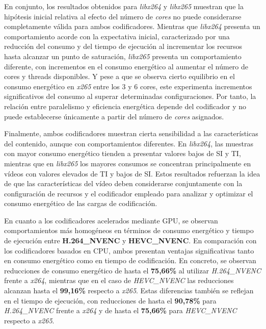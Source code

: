  En conjunto, los resultados obtenidos para \textit{libx264} y \textit{libx265} muestran que la hipótesis inicial relativa al efecto del número de \textit{cores} no puede considerarse completamente válida para ambos codificadores. Mientras que \textit{libx264} presenta un comportamiento acorde con la expectativa inicial, caracterizado por una reducción del consumo y del tiempo de ejecución al incrementar los recursos hasta alcanzar un punto de saturación, \textit{libx265} presenta un comportamiento diferente, con incrementos en el consumo energético al aumentar el número de cores y threads disponibles. Y pese a que se observa cierto equilibrio en el consumo energético en \textit{x265} entre los 3 y 6 cores, este experimenta incrementos significativos del consumo al superar determinadas configuraciones. Por tanto, la relación entre paralelismo y eficiencia energética depende del codificador y no puede establecerse únicamente a partir del número de \textit{cores} asignados.

 Finalmente, ambos codificadores muestran cierta sensibilidad a las características del contenido, aunque con comportamientos diferentes. En \textit{libx264}, las muestras con mayor consumo energético tienden a presentar valores bajos de SI y TI, mientras que en \textit{libx265} los mayores consumos se concentran principalmente en vídeos con valores elevados de TI y bajos de SI. Estos resultados refuerzan la idea de que las características del vídeo deben considerarse conjuntamente con la configuración de recursos y el codificador empleado para analizar y optimizar el consumo energético de las cargas de codificación.

 En cuanto a los codificadores acelerados mediante GPU, se observan comportamientos más homogéneos en términos de consumo energético y tiempo de ejecución entre \textbf{H.264\_NVENC} y \textbf{HEVC\_NVENC}. En comparación con los codificadores basados en CPU, ambos presentan ventajas significativas tanto en consumo energético como en tiempo de codificación. En concreto, se observan reducciones de consumo energético de hasta el \textbf{75,66\%} al utilizar \textit{H.264\_NVENC} frente a \textit{x264}, mientras que en el caso de \textit{HEVC\_NVENC} las reducciones alcanzan hasta el \textbf{99,16\%} respecto a \textit{x265}. Estas diferencias también se reflejan en el tiempo de ejecución, con reducciones de hasta el \textbf{90,78\%} para \textit{H.264\_NVENC} frente a \textit{x264} y de hasta el \textbf{75,66\%} para \textit{HEVC\_NVENC} respecto a \textit{x265}.

